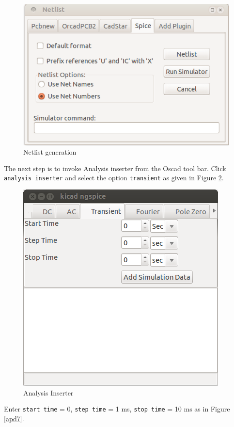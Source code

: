 \begin{enumerate}
\begin{figure}
\begin{center}
\includegraphics[width=0.7\linewidth]{figures/apd4.png}
\caption{Netlist generation}
\label{apd4}
\end{center}
\end{figure}


The next step is to invoke 
Analysis inserter from the Oscad tool bar. Click {\tt analysis inserter} and select the option {\tt transient} as given in Figure \ref{apd6}.
\begin{figure}
\begin{center}
\includegraphics[width=0.5\linewidth]{figures/apd6.png}
\caption{Analysis Inserter}
\label{apd6}
\end{center}
\end{figure}
Enter {\tt start time} = 0, {\tt step time} = 1 ms, {\tt stop time} = 10 ms as in Figure \ref{apd7}.


\end{enumerate}
